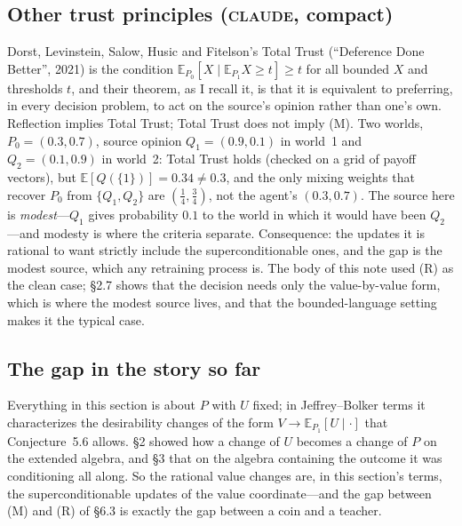 \documentclass[11pt,a4paper]{article}
\newcommand{\E}{\mathbb{E}}
\newcommand{\CLAUDE}{\textnormal{\scshape claude}}
\begin{document}
\subsection{Other trust principles (\CLAUDE, compact)}
Dorst, Levinstein, Salow, Husic and Fitelson's Total Trust (``Deference Done Better'', 2021) is the condition $\E_{P_0}[X \mid \E_{P_1} X \ge t] \ge t$ for all bounded $X$ and thresholds $t$, and their theorem, as I recall it, is that it is equivalent to preferring, in every decision problem, to act on the source's opinion rather than one's own. Reflection implies Total Trust; Total Trust does not imply (M). Two worlds, $P_0 = (0.3, 0.7)$, source opinion $Q_1 = (0.9, 0.1)$ in world~1 and $Q_2 = (0.1, 0.9)$ in world~2: Total Trust holds (checked on a grid of payoff vectors), but $\E[Q(\{1\})] = 0.34 \ne 0.3$, and the only mixing weights that recover $P_0$ from $\{Q_1, Q_2\}$ are $(\tfrac14, \tfrac34)$, not the agent's $(0.3, 0.7)$. The source here is \emph{modest}---$Q_1$ gives probability $0.1$ to the world in which it would have been $Q_2$---and modesty is where the criteria separate. Consequence: the updates it is rational to want strictly include the superconditionable ones, and the gap is the modest source, which any retraining process is. The body of this note used (R) as the clean case; \S2.7 shows that the decision needs only the value-by-value form, which is where the modest source lives, and that the bounded-language setting makes it the typical case.

\subsection{The gap in the story so far}
Everything in this section is about $P$ with $U$ fixed; in Jeffrey--Bolker terms it characterizes the desirability changes of the form $V \to \E_{P_1}[U \mid \cdot]$ that Conjecture~5.6 allows. \S2 showed how a change of $U$ becomes a change of $P$ on the extended algebra, and \S3 that on the algebra containing the outcome it was conditioning all along. So the rational value changes are, in this section's terms, the superconditionable updates of the value coordinate---and the gap between (M) and (R) of \S6.3 is exactly the gap between a coin and a teacher.

\end{document}
